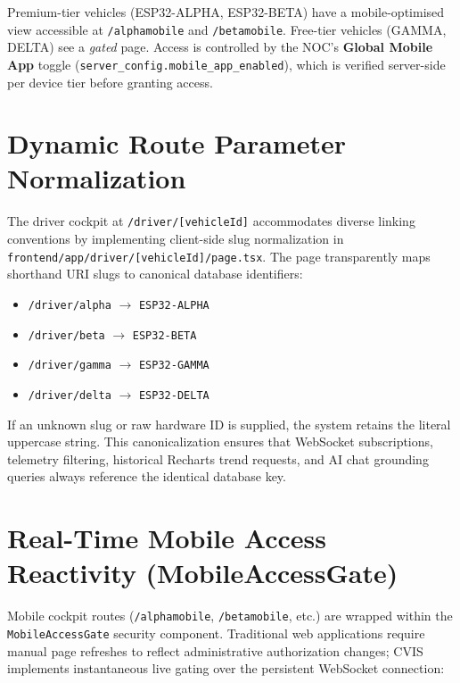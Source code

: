 \documentclass[12pt,a4paper]{report}
\begin{document}
Premium-tier vehicles (ESP32-ALPHA, ESP32-BETA) have a mobile-optimised view accessible at \texttt{/alphamobile} and \texttt{/betamobile}. Free-tier vehicles (GAMMA, DELTA) see a \textit{gated} page. Access is controlled by the NOC's \textbf{Global Mobile App} toggle (\texttt{server\_config.mobile\_app\_enabled}), which is verified server-side per device tier before granting access.

\section{Dynamic Route Parameter Normalization}

The driver cockpit at \texttt{/driver/[vehicleId]} accommodates diverse linking conventions by implementing client-side slug normalization in \nolinkurl{frontend/app/driver/[vehicleId]/page.tsx}. The page transparently maps shorthand URI slugs to canonical database identifiers:
\begin{itemize}[nosep]
  \item \texttt{/driver/alpha} $\longrightarrow$ \texttt{ESP32-ALPHA}
  \item \texttt{/driver/beta} $\longrightarrow$ \texttt{ESP32-BETA}
  \item \texttt{/driver/gamma} $\longrightarrow$ \texttt{ESP32-GAMMA}
  \item \texttt{/driver/delta} $\longrightarrow$ \texttt{ESP32-DELTA}
\end{itemize}
If an unknown slug or raw hardware ID is supplied, the system retains the literal uppercase string. This canonicalization ensures that WebSocket subscriptions, telemetry filtering, historical Recharts trend requests, and AI chat grounding queries always reference the identical database key.

\section{Real-Time Mobile Access Reactivity (MobileAccessGate)}

Mobile cockpit routes (\texttt{/alphamobile}, \texttt{/betamobile}, etc.) are wrapped within the \texttt{MobileAccessGate} security component. Traditional web applications require manual page refreshes to reflect administrative authorization changes; CVIS implements instantaneous live gating over the persistent WebSocket connection:
\end{document}
